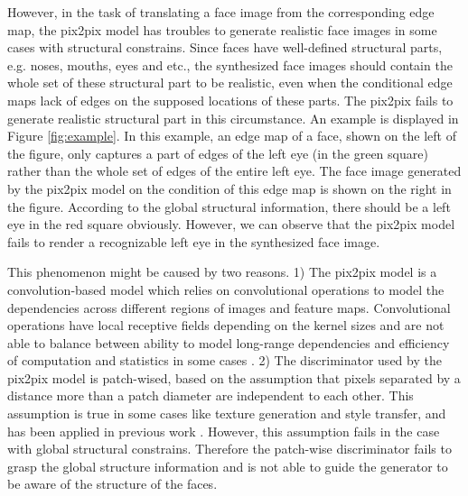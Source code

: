 However, in the task of translating a face image from the corresponding edge map, the pix2pix model has troubles to generate realistic face images in some cases with structural constrains. Since faces have well-defined structural parts, e.g. noses, mouths, eyes and etc., the synthesized face images should contain the whole set of these structural part to be realistic, even when the conditional edge maps lack of edges on the supposed locations of these parts. The pix2pix fails to generate realistic structural part in this circumstance.
An example is displayed in Figure \ref{fig:example}. In this example, an edge map of a face, shown on the left of the figure, only captures a part of edges of the left eye (in the green square) rather than the whole set of edges of the entire left eye. The face image generated by the pix2pix model on the condition of this edge map is shown on the right in the figure. According to the global structural information, there should be a left eye in the red square obviously. However, we can observe that the pix2pix model fails to render a recognizable left eye in the synthesized face image. 

This phenomenon might be caused by two reasons. 
1) The pix2pix model is a convolution-based model which relies on convolutional operations to model the dependencies across different regions of images and feature maps. Convolutional operations have local receptive fields depending on the kernel sizes and are not able to balance between ability to model long-range dependencies and efficiency of computation and statistics in some cases \cite{SAGANs}.
2) The discriminator used by the pix2pix model is patch-wised, based on the assumption that pixels separated by a distance more than a patch diameter are independent to each other. This assumption is true in some cases like texture generation and style transfer, and has been applied in previous work \cite{texture_markovian, styel_transfer}. However, this assumption fails in the case with global structural constrains. Therefore the patch-wise discriminator fails to grasp the global structure information and is not able to guide the generator to be aware of the structure of the faces.

